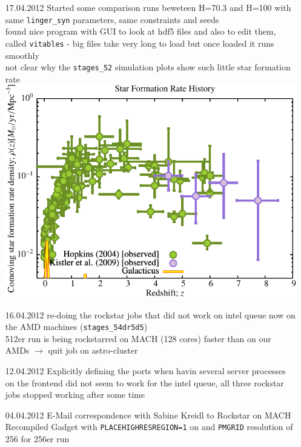 \begin{itemize}
\item[17.04.2012]
Started some comparison runs beweteen H=70.3 and H=100 with same 
\texttt{linger\_syn} parameters, same constraints and seeds \\
found nice program with GUI to look at hdf5 files and also to edit them, 
called \texttt{vitables} - big files take very long to load but 
once loaded it runs smoothly \\
not clear why the \texttt{stages\_52} simulation plots show 
such little star formation rate 
\includegraphics[scale=0.5]{r256/h100/stages_52/Plot_Star_Formation_History_small.pdf} \\

\item[16.04.2012]
re-doing the rockstar jobs that did not work on intel queue 
now on the AMD machines (\texttt{stages\_54dr5d5}) \\ 
512er run is being rockstarred on MACH (128 cores) faster than on 
our AMDs $\rightarrow$ quit job on astro-cluster \\

\item[12.04.2012]
Explicitly defining the ports when havin several server processes on
the frontend did not seem to work for the intel queue, all 
three rockstar jobs stopped working after some time \\

\item[04.04.2012]
E-Mail correspondence with Sabine Kreidl to Rockstar on MACH \\
Recompiled Gadget with \texttt{PLACEHIGHRESREGION=1} on and 
\texttt{PMGRID} resolution of 256 for 256er run \\


\end{itemize}
